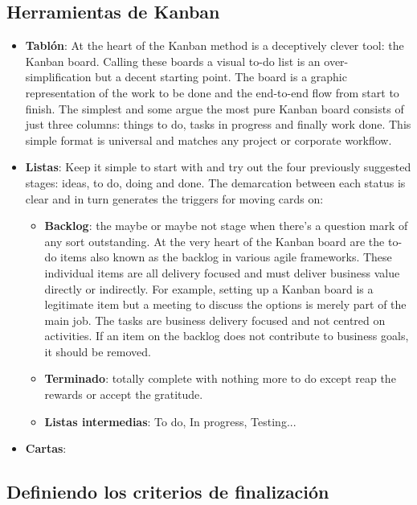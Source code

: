 \subsection{Herramientas de Kanban}
\begin{itemize}
    \item \textbf{Tablón}:
    At the heart of the Kanban method is a deceptively clever tool:
    the Kanban board. Calling these boards a visual to-do list is an
    over-simplification but a decent starting point. The board is a
    graphic representation of the work to be done and the end-to-end
    flow from start to finish. The simplest and some argue the most
    pure Kanban board consists of just three columns: things to do,
    tasks in progress and finally work done. This simple format is
    universal and matches any project or corporate workflow.
    \item \textbf{Listas}:
    Keep it simple to start with and try out the four previously
    suggested stages: ideas, to do, doing and done. The demarcation between each
    status is clear and in turn generates the triggers for moving cards on:
    \begin{itemize}
        \item \textbf{Backlog}: the maybe or maybe not stage when there's a question
        mark of any sort outstanding. At the very heart of the Kanban board are the to-do items also
        known as the backlog in various agile frameworks. These individual
        items are all delivery focused and must deliver business value
        directly or indirectly. For example, setting up a Kanban board is
        a legitimate item but a meeting to discuss the options is merely
        part of the main job. The tasks are business delivery focused
        and not centred on activities. If an item on the backlog does not
        contribute to business goals, it should be removed.
        \item \textbf{Terminado}: totally complete with nothing more to do except reap
        the rewards or accept the gratitude.
        \item \textbf{Listas intermedias}: To do, In progress, Testing...
    \end{itemize}
    \item \textbf{Cartas}:
\end{itemize}

\subsection{Definiendo los criterios de finalización}

